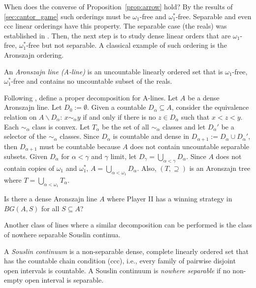 When does the converse of Proposition~\ref{prop:arrow} hold?
By the results of \ref{sec:cantor_game} such orderings must be $\omega_1$-free and $\omega_1^*$-free.
Separable and even ccc linear orderings have this property.
The separable case (the reals) was established in \cite{brian-clontz}.
Then, the next step is to study dense linear orders that are $\omega_1$-free, $\omega_1^*$-free but not separable.
A classical example of such ordering is the Aronszajn ordering.

\begin{definition}
    An \emph{Aronszajn line (A-line)} is an uncountable linearly ordered set that is $\omega_1$-free, $\omega_1^*$-free and contains no uncountable subset of the reals.
\end{definition}

Following \cite{A-orderings}, define a proper decomposition for A-lines.
Let $A$ be a dense Aronszajn line.
Let $D_0:=\emptyset$.
Given a countable $D_\alpha\subseteq A$, consider the equivalence relation on $A\backslash D_\alpha$: $x\sim_\alpha y$ if and only if there is no $z\in D_\alpha$ such that $x<z<y$.
Each $\sim_\alpha$ class is convex.
Let $T_\alpha$ be the set of all $\sim_\alpha$ classes and let $D_\alpha'$ be a selector of the $\sim_\alpha$ classes.
Since $D_\alpha$ is countable and dense in $D_{\alpha+1}:=D_\alpha\cup D_\alpha'$, then $D_{\alpha+1}$ must be countable because $A$ does not contain uncountable separable subsets.
Given $D_\alpha$ for $\alpha<\gamma$ and $\gamma$ limit, let $D_\gamma=\bigcup_{\alpha<\gamma}D_\alpha$.
Since $A$ does not contain copies of $\omega_1$ and $\omega_1^*$, $A=\bigcup_{\alpha<\omega_1}D_\alpha$.
Also, $(T,\supseteq)$ is an Aronszajn tree where $T=\bigcup_{\alpha<\omega_1}T_\alpha$.

\begin{question}
    Is there a dense Aronszajn line $A$ where Player II has a winning strategy in $BG(A,S)$ for all $S\subseteq A$?
\end{question}

Another class of lines where a similar decomposition can be performed is the class of nowhere separable Souslin continua.

\begin{definition}
    A \emph{Souslin continuum} is a non-separable dense, complete linearly ordered set that has the countable chain condition (ccc), i.e., every family of pairwise disjoint open intervals is countable.
    A Souslin continuum is \emph{nowhere separable} if no non-empty open interval is separable.
\end{definition}

